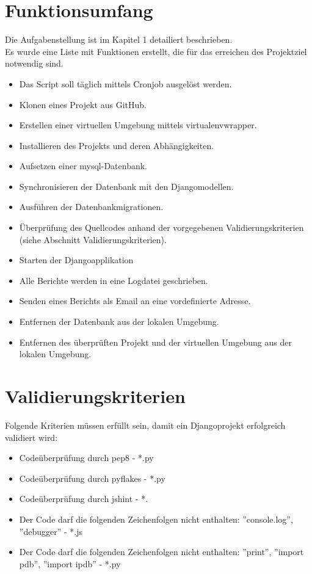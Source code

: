 \section{Funktionsumfang}
Die Aufgabenstellung ist im Kapitel 1 detailiert beschrieben. \\
Es wurde eine Liste mit Funktionen erstellt, die für das erreichen des Projektziel notwendig sind.
\begin{itemize}
    \item Das Script soll täglich mittels Cronjob ausgelöst werden.
    \item Klonen eines Projekt aus GitHub. 
    \item Erstellen einer virtuellen Umgebung mittels virtualenvwrapper.
    \item Installieren des Projekts und deren Abhängigkeiten.
    \item Aufsetzen einer mysql-Datenbank. 
    \item Synchronisieren der Datenbank mit den Djangomodellen.
    \item Ausführen der Datenbankmigrationen.
    \item Überprüfung des Quellcodes anhand der vorgegebenen Validierungskriterien (siehe Abschnitt Validierungskriterien).
    \item Starten der Djangoapplikation
    \item Alle Berichte werden in eine Logdatei geschrieben. 
    \item Senden eines Berichts als Email an eine vordefinierte Adresse.
    \item Entfernen der Datenbank aus der lokalen Umgebung.
    \item Entfernen des überprüften Projekt und der virtuellen Umgebung aus der lokalen Umgebung.
\end{itemize}


\section{Validierungskriterien}
Folgende Kriterien müssen erfüllt sein, damit ein Djangoprojekt erfolgreich validiert wird:
\begin{itemize}
    \item Codeüberprüfung durch pep8 - *.py
    \item Codeüberprüfung durch pyflakes - *.py
    \item Codeüberprüfung durch jshint - *.
    \item Der Code darf die folgenden Zeichenfolgen nicht enthalten: ''console.log'', ''debugger'' - *.js
    \item Der Code darf die folgenden Zeichenfolgen nicht enthalten: ''print'', ''import pdb'', ''import ipdb'' - *.py
\end{itemize}


